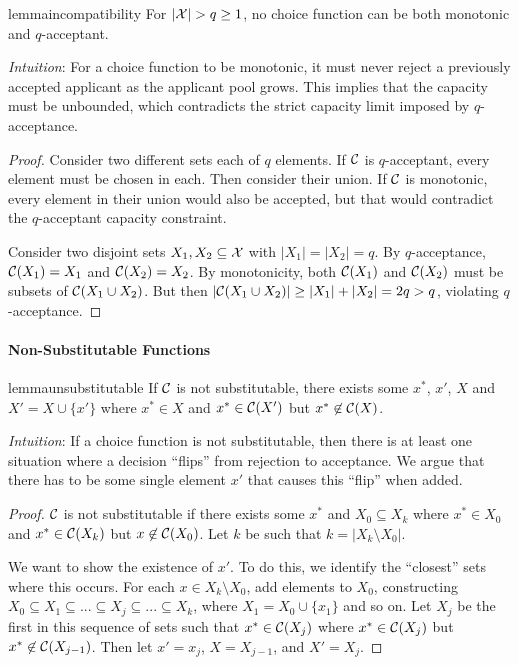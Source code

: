\begin{restatable}{lemma}{incompatibility}
\label{thm:mono-accept-mutex}
For $|\mathcal{X}| > q \geq 1$, no choice function can be both monotonic and $q$-acceptant.
\end{restatable}

\textit{Intuition}: %
For a choice function to be monotonic, it must never reject a previously accepted applicant as the applicant pool grows. This implies that the capacity must be unbounded, which contradicts the strict capacity limit imposed by $q$-acceptance.%

\begin{proof}
Consider two different sets each of $q$ elements. If $\mathcal{C}$ is $q$-acceptant, every element must be chosen in each. Then consider their union. If $\mathcal{C}$ is monotonic, every element in their union would also be accepted, but that would contradict the $q$-acceptant capacity constraint.

Consider two disjoint sets $X_1, X_2 \subseteq \mathcal{X}$ with $|X_1| = |X_2| = q$. By $q$-acceptance, $\mathcal{C}(X_1) = X_1$ and $\mathcal{C}(X_2) = X_2$. By monotonicity, both $\mathcal{C}(X_1)$ and $\mathcal{C}(X_2)$ must be subsets of $\mathcal{C}(X_1 \cup X_2)$. But then $|\mathcal{C}(X_1 \cup X_2)| \geq |X_1| + |X_2| = 2q > q$, violating $q$-acceptance.
\end{proof}

\paragraph{Non-Substitutable Functions}
\begin{restatable}{lemma}{unsubstitutable}
\label{lem:unsubstitutable}
If $\mathcal{C}$ is not substitutable, there exists some $x^*$, $x'$, $X$ and $X' = X \cup \{x'\}$ where $x^* \in X$ and $x^* \in \mathcal{C}(X')$ but $x^* \not\in \mathcal{C}(X)$.
\end{restatable}

\textit{Intuition}:
If a choice function is not substitutable, then there is at least one situation where a decision ``flips'' from rejection to acceptance.
We argue that there has to be some single element $x'$ that causes this ``flip'' when added.

\begin{proof}
$\mathcal{C}$ is not substitutable if there exists some  $x^*$ and $X_0 \subseteq X_k$ where $x^* \in X_0$ and $x^* \in \mathcal{C}(X_k)$ but $x \not\in \mathcal{C}(X_0)$.
Let $k$ be such that $k = |X_k \setminus X_0|$.%

We want to show the existence of $x'$. To do this, we identify the ``closest'' sets where this occurs. For each $x \in X_k \setminus X_0$, add elements to $X_0$, constructing $X_0 \subseteq X_1 \subseteq ... \subseteq X_j \subseteq ... \subseteq X_k$, where $X_1 = X_0 \cup \{x_1\}$ and so on. Let $X_j$ be the first in this sequence of sets such that $x^* \in \mathcal{C}(X_j)$ where $x^* \in \mathcal{C}(X_j)$ but $x^* \not\in \mathcal{C}(X_{j-1})$. Then let $x' = x_j$, $X = X_{j-1}$, and $X' = X_j$.
\end{proof}

